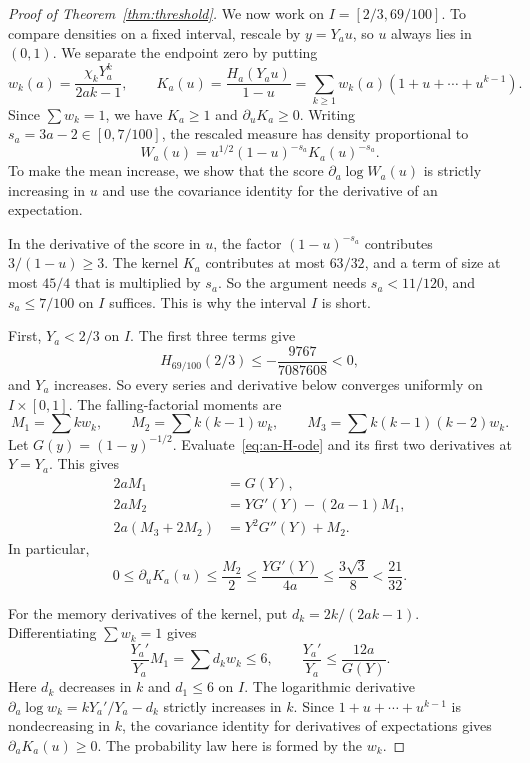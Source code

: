 \begin{proof}[Proof of Theorem~\ref{thm:threshold}]
We now work on $I=[2/3,69/100]$. To compare densities on a fixed
interval, rescale by $y=Y_au$, so $u$ always lies in $(0,1)$.
We separate the endpoint zero by putting
\begin{equation}\label{eq:an-weights}
 w_k(a)=\frac{\chi_kY_a^k}{2ak-1},\qquad
 K_a(u)=\frac{H_a(Y_au)}{1-u}
       =\sum_{k\ge1}w_k(a)(1+u+\cdots+u^{k-1}).
\end{equation}
Since $\sum w_k=1$, we have $K_a\ge1$ and $\partial_uK_a\ge0$.
Writing $s_a=3a-2\in[0,7/100]$, the rescaled measure has density
proportional to
\begin{equation}\label{eq:an-rescaled-weight}
 W_a(u)=u^{1/2}(1-u)^{-s_a}K_a(u)^{-s_a}.
\end{equation}
To make the mean increase, we show that the score
$\partial_a\log W_a(u)$ is strictly increasing in $u$ and use
the covariance identity for the derivative of an expectation.

In the derivative of the score in $u$, the factor $(1-u)^{-s_a}$
contributes $3/(1-u)\ge3$. The kernel $K_a$ contributes at most
$63/32$, and a term of size at most $45/4$ that is multiplied by
$s_a$. So the argument needs $s_a<11/120$, and $s_a\le7/100$ on $I$
suffices. This is why the interval $I$ is short.

First, $Y_a<2/3$ on $I$. The first three terms give
\[
 H_{69/100}(2/3)\le-\frac{9767}{7087608}<0,
\]
and $Y_a$ increases. So every series and derivative below converges
uniformly on $I\times[0,1]$. The falling-factorial moments are
\[
 M_1=\sum k w_k,\qquad M_2=\sum k(k-1)w_k,\qquad
 M_3=\sum k(k-1)(k-2)w_k.
\]
Let $G(y)=(1-y)^{-1/2}$. Evaluate~\eqref{eq:an-H-ode} and its first
two derivatives at $Y=Y_a$. This gives
\begin{equation}\label{eq:an-factorial-moments}
 \begin{split}
 2aM_1&=G(Y),\\
 2aM_2&=YG'(Y)-(2a-1)M_1,\\
 2a(M_3+2M_2)&=Y^2G''(Y)+M_2.
 \end{split}
\end{equation}
In particular,
\begin{equation}\label{eq:an-Ku}
 0\le\partial_uK_a(u)\le\frac{M_2}{2}
 \le\frac{YG'(Y)}{4a}
 \le\frac{3\sqrt3}{8}<\frac{21}{32}.
\end{equation}

For the memory derivatives of the kernel, put $d_k=2k/(2ak-1)$. Differentiating $\sum w_k=1$ gives
\begin{equation}\label{eq:an-root-derivative}
 \frac{Y_a'}{Y_a}M_1=\sum d_kw_k\le6,
 \qquad \frac{Y_a'}{Y_a}\le\frac{12a}{G(Y)}.
\end{equation}
Here $d_k$ decreases in $k$ and $d_1\le6$ on $I$.
The logarithmic derivative $\partial_a\log w_k=kY_a'/Y_a-d_k$
strictly increases in $k$. Since $1+u+\cdots+u^{k-1}$
is nondecreasing in $k$, the covariance identity for
derivatives of expectations gives $\partial_aK_a(u)\ge0$.
The probability law here is formed by the $w_k$.


\end{proof}
